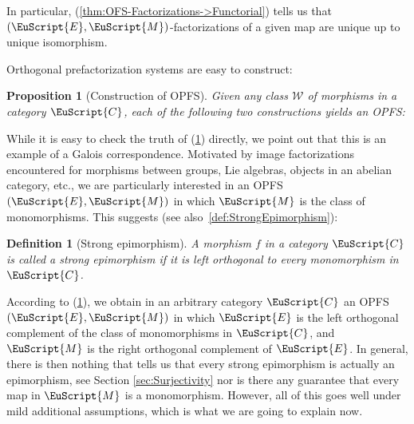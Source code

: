\documentclass [12pt,oneside]{book}%
\theoremstyle{captionstyle}  %
\newtheorem{definition}[theorem]{Definition}
\newtheorem{proposition}[theorem]{Proposition}
\newcommand{\NoProof}{{\unskip\nobreak\hfil\penalty 50\hskip 2em\hbox{}
			\nobreak\hfil$\lozenge$\parfillskip=0pt\finalhyphendemerits=0\par}}
\newcommand{\Defn}[1]{\emph{#1}}
\newcommand{\Ctgry}[1]{\EuScript{#1}}					%
\begin{document}
In particular, (\ref{thm:OFS-Factorizations->Functorial}) tells us that $(\EuScript{E},\EuScript{M})$-factorizations of a given map are unique up to unique isomorphism.

Orthogonal prefactorization systems are easy to construct:

\begin{proposition}[Construction of OPFS]
    \label{thm:OPFS-Construct}%
    Given any class $\mathcal{W}$ of morphisms in a category $\Ctgry{C}$, each of the following two constructions yields an OPFS:
\end{proposition}

While it is easy to check the truth of (\ref{thm:OPFS-Construct}) directly, we point out that this is an example of a Galois correspondence. Motivated by image factorizations encountered for morphisms between groups, Lie algebras, objects in an abelian category, etc., we are particularly interested in an OPFS $(\EuScript{E},\EuScript{M})$ in which $\EuScript{M}$ is the class of monomorphisms. This suggests (see also~\eqref{def:StrongEpimorphism}):

\begin{definition}[Strong epimorphism]
    \label{def:Strong-Epimorphism}
    A morphism $f$ in a category $\Ctgry{C}$ is called a \Defn{strong epimorphism} if it is left orthogonal to every monomorphism in $\Ctgry{C}$.
\end{definition}

According to (\ref{thm:OPFS-Construct}), we obtain in an arbitrary category $\Ctgry{C}$ an OPFS $(\EuScript{E},\EuScript{M})$ in which $\EuScript{E}$ is the left orthogonal complement of the class of monomorphisms in $\Ctgry{C}$, and $\EuScript{M}$ is the right orthogonal complement of $\EuScript{E}$. In general, there is then nothing that tells us that every strong epimorphism is actually an epimorphism, see Section \ref{sec:Surjectivity} nor is there any guarantee that every map in $\EuScript{M}$ is a monomorphism. However, all of this goes well under mild additional assumptions, which is what we are going to explain now.
\end{document}
